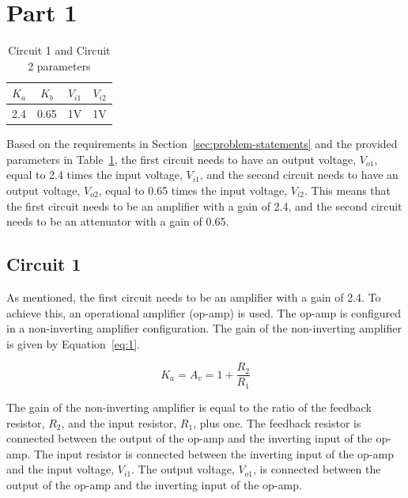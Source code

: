 \documentclass{zc-ust-hw}
\begin{document}
\section{Part 1}

\begin{table}[H]
  \caption{Circuit 1 and Circuit 2 parameters}\label{tab:1}
  \begin{center}
    \begin{tabular}{|c|c|c|c|}
      \hline
      $K_a$ & $K_b$ & $V_{i1}$ & $V_{i2}$ \\
      \hline
      2.4 & 0.65 & 1V & 1V \\
      \hline
    \end{tabular}
  \end{center}
\end{table}

Based on the requirements in Section~\ref{sec:problem-statements} and the
provided parameters in Table~\ref{tab:1}, the first circuit needs to have an
output voltage, $V_{o1}$, equal to 2.4 times the input voltage, $V_{i1}$, and
the second circuit needs to have an output voltage, $V_{o2}$, equal to 0.65
times the input voltage, $V_{i2}$. This means that the first circuit needs to
be an amplifier with a gain of 2.4, and the second circuit needs to be an
attenuator with a gain of 0.65.

\subsection{Circuit 1}
\label{sec:circuit-1}

As mentioned, the first circuit needs to be an amplifier with a gain of 2.4. To
achieve this, an operational amplifier (op-amp) is used. The op-amp is
configured in a non-inverting amplifier configuration. The gain of the
non-inverting amplifier is given by Equation~\ref{eq:1}.

\begin{equation}
  \label{eq:1}
  K_a = A_v = 1 + \frac{R_2}{R_1}
\end{equation}

The gain of the non-inverting amplifier is equal to the ratio of the feedback
resistor, $R_2$, and the input resistor, $R_1$, plus one. The feedback resistor
is connected between the output of the op-amp and the inverting input of the
op-amp. The input resistor is connected between the inverting input of the
op-amp and the input voltage, $V_{i1}$. The output voltage, $V_{o1}$, is
connected between the output of the op-amp and the inverting input of the
op-amp.
\end{document}
